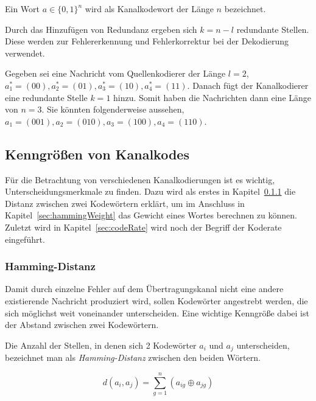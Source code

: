 \begin{t_def}
Ein Wort $a \in \{0,1\}^n$ wird als Kanalkodewort der Länge $n$ bezeichnet.
\end{t_def} 

Durch das Hinzufügen von Redundanz ergeben sich $k = n - l$ redundante Stellen. Diese werden zur Fehlererkennung und Fehlerkorrektur bei der Dekodierung verwendet.

\begin{e_exa}
Gegeben sei eine Nachricht vom Quellenkodierer der Länge $l=2$, $a^*_{1}=(00),a^*_{2}=(01),a^*_{3}=(10),a^*_{4}=(11)$. Danach fügt der Kanalkodierer eine redundante Stelle $k=1$ hinzu. Somit haben die Nachrichten dann eine Länge von $n=3$. Sie könnten folgenderweise aussehen, $a_{1}=(001),a_{2}=(010),a_{3}=(100),a_{4}=(110)$.
\end{e_exa}

\subsection{Kenngrößen von Kanalkodes}
\label{sec:channelParameters}
Für die Betrachtung von verschiedenen Kanalkodierungen ist es wichtig, Unterscheidungsmerkmale zu finden. Dazu wird als erstes in Kapitel~\ref{sec:hammingDistance} die Distanz zwischen zwei Kodewörtern erklärt, um im Anschluss in Kapitel~\ref{sec:hammingWeight} das Gewicht eines Wortes berechnen zu können. Zuletzt wird in Kapitel~\ref{sec:codeRate} wird noch der Begriff der Koderate eingeführt.

\subsubsection{Hamming-Distanz}
\label{sec:hammingDistance}
Damit durch einzelne Fehler auf dem Übertragungskanal nicht eine andere existierende Nachricht produziert wird, sollen Kodewörter angestrebt werden, die sich möglichst weit voneinander unterscheiden. Eine wichtige Kenngröße dabei ist der Abstand zwischen zwei Kodewörtern.

\begin{t_def}
Die Anzahl der Stellen, in denen sich 2 Kodewörter $a_i$ und $a_j$ unterscheiden, bezeichnet man als \emph{Hamming-Distanz} zwischen den beiden Wörtern.
\end{t_def} 
 
\begin{equation}
d(a_i,a_j) = \sum^{n}_{g=1} (a_{ig} \oplus a_{jg})
\label{eq:hammingDistance}
\end{equation}

